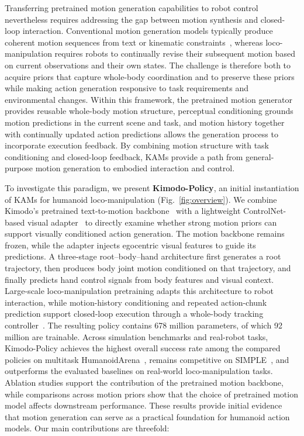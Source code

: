 Transferring pretrained motion generation capabilities to robot control nevertheless requires addressing the gap between motion synthesis and closed-loop interaction. Conventional motion generation models typically produce coherent motion sequences from text or kinematic constraints~\citep{mdm,omnicontrol,kimodo}, whereas loco-manipulation requires robots to continually revise their subsequent motion based on current observations and their own states. The challenge is therefore both to acquire priors that capture whole-body coordination and to preserve these priors while making action generation responsive to task requirements and environmental changes. Within this framework, the pretrained motion generator provides reusable whole-body motion structure, perceptual conditioning grounds motion predictions in the current scene and task, and motion history together with continually updated action predictions allows the generation process to incorporate execution feedback. By combining motion structure with task conditioning and closed-loop feedback, KAMs provide a path from general-purpose motion generation to embodied interaction and control.

To investigate this paradigm, we present \textbf{Kimodo-Policy}, an initial instantiation of KAMs for humanoid loco-manipulation (Fig.~\ref{fig:overview}). We combine Kimodo's pretrained text-to-motion backbone~\citep{kimodo} with a lightweight ControlNet-based visual adapter~\citep{zhang2023adding} to directly examine whether strong motion priors can support visually conditioned action generation. The motion backbone remains frozen, while the adapter injects egocentric visual features to guide its predictions. A three-stage root--body--hand architecture first generates a root trajectory, then produces body joint motion conditioned on that trajectory, and finally predicts hand control signals from body features and visual context. Large-scale loco-manipulation pretraining adapts this architecture to robot interaction, while motion-history conditioning and repeated action-chunk prediction support closed-loop execution through a whole-body tracking controller~\citep{sonic}. The resulting policy contains 678 million parameters, of which 92 million are trainable. Across simulation benchmarks and real-robot tasks, Kimodo-Policy achieves the highest overall success rate among the compared policies on multitask HumanoidArena~\citep{humanoidarena}, remains competitive on SIMPLE~\citep{simple}, and outperforms the evaluated baselines on real-world loco-manipulation tasks. Ablation studies support the contribution of the pretrained motion backbone, while comparisons across motion priors show that the choice of pretrained motion model affects downstream performance. These results provide initial evidence that motion generation can serve as a practical foundation for humanoid action models. Our main contributions are threefold:

